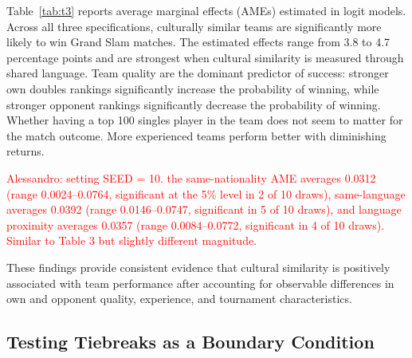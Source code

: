 \documentclass[10pt]{article}
\begin{document}
Table~\ref{tab:t3} reports average marginal effects (AMEs) estimated in logit models. %
Across all three specifications, culturally similar teams are significantly more likely to win Grand Slam matches. The estimated effects range from 3.8 to 4.7 percentage points and are strongest when cultural similarity is measured through shared language. Team quality are the dominant predictor of success: stronger own doubles rankings significantly increase the probability of winning, while stronger opponent rankings significantly decrease the probability of winning. Whether having a top 100 singles player in the team does not seem to matter for the match outcome. More experienced teams perform better with diminishing returns.

 \textcolor{red}{Alessandro: setting SEED = 10. the same-nationality AME averages 0.0312 (range 0.0024--0.0764, significant at the 5\% level in 2 of 10 draws), same-language averages 0.0392 (range 0.0146--0.0747, significant in 5 of 10 draws), and language proximity averages 0.0357 (range 0.0084--0.0772, significant in 4 of 10 draws). Similar to Table 3 but slightly different magnitude.}

These findings provide consistent evidence that cultural similarity is positively associated with team performance after accounting for observable differences in own and opponent quality,  experience, and tournament characteristics.

\subsection{Testing Tiebreaks as a Boundary Condition} 


\end{document}
